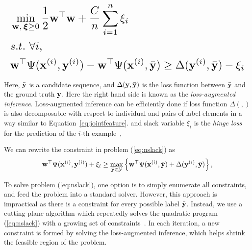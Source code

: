 \begin{equation}
\resizebox{0.99\linewidth}{!}{$\displaystyle
\begin{aligned}
&\min_{\w, \, \bm{\xi} \ge 0} \frac{1}{2} \w^\top \w + \frac{C}{n} \sum_{i=1}^n \xi_i \label{eq:nslack}\\
&s.t.~  \forall i, \nonumber\\
& \w^\top \Psi(\x^{(i)}, \y^{(i)}) - \w^\top \Psi(\x^{(i)}, \bar{\y}) \ge
  \Delta(\y^{(i)}, \bar{\y}) - \xi_i \nonumber
\end{aligned}
$}
\end{equation}

Here, $\bar{\mathbf{y}}$ is a candidate sequence,  %
and $\Delta(\mathbf{y}, \bar{\mathbf{y}})$ is the loss function between $\bar{\mathbf{y}}$ and the ground truth $\mathbf{y}$.
Here the right hand side is known as the \emph{loss-augmented inference}.
Loss-augmented inference can be efficiently done if loss function $\Delta(,)$ is also decomposable
with respect to individual and pairs of label elements in a way similar to Equation~\eqref{eq:jointfeature}.
and slack variable $\xi_i$ is the \emph{hinge loss} for the prediction of the $i$-th example~\cite{tsochantaridis2005large},

We can rewrite the constraint in problem (\ref{eq:nslack}) as
\begin{equation}
\label{eq:ssvminf}
\mathbf{w}^\top \Psi(\mathbf{x}^{(i)}, \mathbf{y}^{(i)}) + \xi_i \ge
          \max_{\bar{\mathbf{y}} \in \mathcal{Y}}
          \left\{\mathbf{w}^\top \Psi(\mathbf{x}^{(i)}, \bar{\mathbf{y}}) + \Delta(\mathbf{y}^{(i)}, \bar{\mathbf{y}}) \right\},
\end{equation}


To solve problem (\ref{eq:nslack}), one option is to simply enumerate all constraints, and feed the problem into a standard solver.
However, this approach is impractical as there is a constraint for every possible label $\bar{\mathbf{y}}$.
Instead, we use a cutting-plane algorithm which repeatedly solves the quadratic program (\ref{eq:nslack})
with a growing set of constraints~\cite{joachims2009predicting}.
In each iteration, a new constraint is formed by solving the loss-augmented inference,
which helps shrink the feasible region of the problem.


